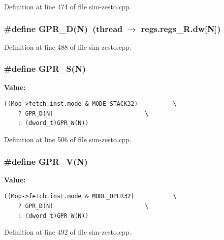 Definition at line 474 of file sim-zesto.cpp.
\subsubsection[{GPR\_\-D}]{\setlength{\rightskip}{0pt plus 5cm}\#define GPR\_\-D(N)~(thread $\rightarrow$ regs.regs\_\-R.dw[N])}\label{sim-zesto_8cpp_47f414f821791526173fe7d70d726fb2}




Definition at line 488 of file sim-zesto.cpp.
\subsubsection[{GPR\_\-S}]{\setlength{\rightskip}{0pt plus 5cm}\#define GPR\_\-S(N)}\label{sim-zesto_8cpp_7533b70fb575778a0b20811f5a9c8bb4}


\textbf{Value:}

\begin{Code}\begin{verbatim}((Mop->fetch.inst.mode & MODE_STACK32)          \
    ? GPR_D(N)                          \
    : (dword_t)GPR_W(N))
\end{verbatim}
\end{Code}


Definition at line 506 of file sim-zesto.cpp.
\subsubsection[{GPR\_\-V}]{\setlength{\rightskip}{0pt plus 5cm}\#define GPR\_\-V(N)}\label{sim-zesto_8cpp_643f69abe43c44c53ccb513dc75b8edd}


\textbf{Value:}

\begin{Code}\begin{verbatim}((Mop->fetch.inst.mode & MODE_OPER32)           \
    ? GPR_D(N)                          \
    : (dword_t)GPR_W(N))
\end{verbatim}
\end{Code}


Definition at line 492 of file sim-zesto.cpp.
